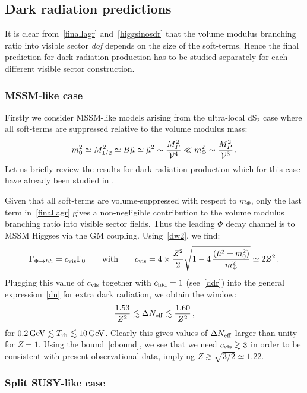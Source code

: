 \documentclass[11pt,a4paper]{article}
\newcommand{\be}{\begin{equation}}
\newcommand{\ee}{\end{equation}}
\newcommand\vo{{\mathcal{V}}}
\newcommand{\V}{{\cal{V}}}
\begin{document}
\subsection{Dark radiation predictions}

It is clear from~\eqref{finallagr} and~\eqref{higgsinosdr} that the volume modulus branching ratio into visible sector \textit{dof} depends on the size of the soft-terms. Hence the final prediction for dark radiation production has to be studied separately for each different visible sector construction. 

\subsubsection{MSSM-like case}

Firstly we consider MSSM-like models arising from the ultra-local dS$_2$ case where all soft-terms are suppressed relative to the volume modulus mass:
\be
m_0^2 \simeq M_{1/2}^2 \simeq B\hat{\mu} \simeq \hat{\mu}^2 \sim \frac{M_P^2}{\vo^4} \ll m_{\Phi}^2 \sim \frac{M_P^2}{\V^3}\,.
\ee
Let us briefly review the results for dark radiation production which for this case have already been studied in \cite{DR1, DR2}. 

Given that all soft-terms are volume-suppressed with respect to $m_\Phi$, only the last term in~\eqref{finallagr} gives a non-negligible contribution to the volume modulus branching ratio into visible sector fields. Thus the leading $\Phi$ decay channel is to MSSM Higgses via the GM coupling. Using~\eqref{dw2}, we find:  
\be
\label{phihh1}
\Gamma_{\Phi \rightarrow hh} = c_{\rm vis}\Gamma_0\qquad\text{with}\qquad c_{\rm vis}= 4\times\frac{Z^2}{2} \sqrt{1 - 4\,\frac{(\hat\mu^2+m_0^2)}{m_\Phi^2}} \simeq 2 Z^2\,.
\ee
Plugging this value of $c_{\rm vis}$ together with $c_{\rm hid}=1$ (see~\eqref{ddr}) into the general expression~\eqref{dn} for extra dark radiation, we obtain the window:
\be
\frac{1.53}{Z^2}\lesssim \Delta N_{\rm eff}\lesssim  \frac{1.60}{Z^2}\,,
\label{MSSMpred}
\ee
for $0.2 \, {\rm GeV} \lesssim T_{\rm rh} \lesssim 10 \, {\rm GeV}$. Clearly this gives values of $\Delta N_{\rm eff}$ larger than unity for $Z = 1$. Using the bound~\eqref{cbound}, we see that we need $c_{\rm vis}\gtrsim 3$ in order to be consistent with present observational data, implying $Z\gtrsim \sqrt{3/2}\simeq 1.22$.

\subsubsection{Split SUSY-like case}
\label{splitsusycase}
\end{document}

